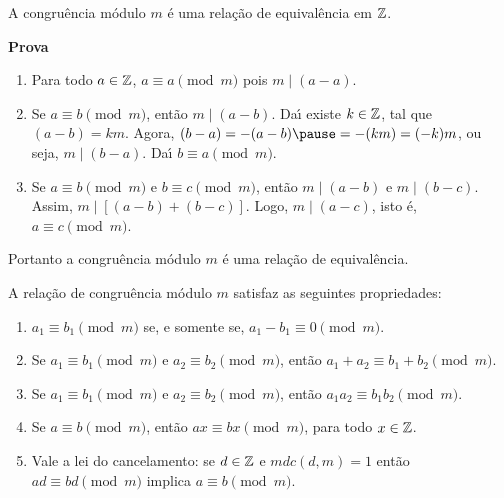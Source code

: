 \documentclass{beamer}
\begin{document}
    \begin{frame}
        \begin{proposicao}
            A congru{\^e}ncia m{\'o}dulo $m$ {\'e} uma rela{\c c}{\~a}o de equival{\^e}ncia em $\mathbb{Z}$.\pause
        \end{proposicao}
        \noindent\textbf{Prova}
        \begin{enumerate}[label={\roman*})]
            \item Para todo $a \in \mathbb{Z}$, $a\equiv a\pmod{m}$ \pause pois $m\mid (a-a)$.\pause \vspace{.3cm}

            \item Se $a\equiv b\pmod{m}$, \pause ent{\~a}o $m\mid (a - b)$. \pause Da{\'\i} existe $k \in \mathbb{Z}$, \pause tal que $(a - b) = km$. \pause Agora, $(b - a) = -(a - b) \pause = -(km) = (-k)m$, \pause ou seja, $m \mid (b - a)$. \pause Da{\'\i} $b\equiv a \pmod{m}$.\pause \vspace{.3cm}

            \item Se $a\equiv b\pmod{m}$ \pause e $b\equiv c\pmod{m}$, \pause ent{\~a}o $m\mid (a-b)$ \pause e $m\mid (b-c)$. \pause Assim, $m\mid [(a-b)+(b-c)]$. \pause Logo, $m\mid (a-c)$, \pause isto {\'e}, $a\equiv c\pmod{m}$.\pause
        \end{enumerate}
        Portanto a congru{\^e}ncia m{\'o}dulo $m$ {\'e} uma rela{\c c}{\~a}o de equival{\^e}ncia.\hspace{.5cm} \qedsymbol\pause
    \end{frame}
    \begin{frame}
        \begin{teorema}
            A rela{\c c}{\~a}o de congru{\^e}ncia m{\'o}dulo $m$ satisfaz as seguintes propriedades:\pause
            \begin{enumerate}[label={\roman*})]
                \item $a_{1}\equiv b_{1}\pmod{m}$ se, e somente se, $a_{1}-b_{1}\equiv 0\pmod{m}$.\pause \vspace{.3cm}

                \item Se $a_{1}\equiv b_{1}\pmod{m}$ e $a_{2}\equiv b_{2}\pmod{m}$, ent{\~a}o $a_{1}+a_{2}\equiv b_{1}+b_{2}\pmod{m}$.\pause \vspace{.3cm}

                \item Se $a_{1}\equiv b_{1}\pmod{m}$ e $a_{2}\equiv b_{2}\pmod{m}$, ent{\~a}o $a_{1}a_{2}\equiv b_{1}b_{2}\pmod{m}$.\label{item_provado}\pause \vspace{.3cm}

                \item Se $a\equiv b\pmod{m}$, ent{\~a}o $ax\equiv bx\pmod{m}$, para todo $x \in \mathbb{Z}$.\pause \vspace{.3cm}

                \item Vale a lei do cancelamento: se $d \in \mathbb{Z}$ e $mdc(d,m) = 1$ ent{\~a}o $ad \equiv bd \pmod{m}$ implica $a\equiv b \pmod{m}$.\pause
            \end{enumerate}
        \end{teorema}
    \end{frame}
\end{document}
